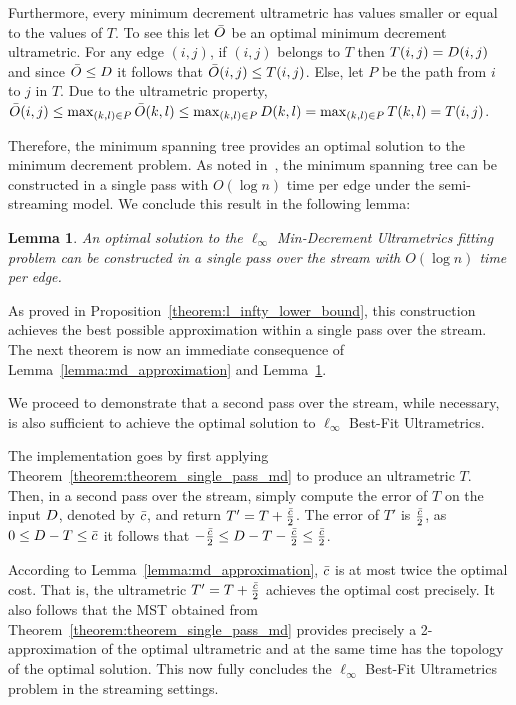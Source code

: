 \documentclass{article}
\newtheorem{lemma}[theorem]{Lemma}
\begin{document}
Furthermore, every minimum decrement ultrametric has values smaller or equal to the values of $T$. 
To see this let $\bar{O}$ be an optimal minimum decrement ultrametric. For any edge $(i,j)$, if $(i,j)$ belongs to $T$ then $T ({i,j})=D (i,j)$ and since $\bar{O} \leq D$ it follows that $\bar{O} ({i,j}) \leq T ({i,j})$. Else, let $P$ be the path from $i$ to $j$ in $T$. Due to the ultrametric property, $\bar{O} ({i,j}) \leq \max_{(k,l)\in P} \bar{O} ({k,l}) \leq 
\max_{(k,l)\in P} D ({k,l}) = \max_{(k,l)\in P} T ({k,l}) = T ({i,j})$.

Therefore, the minimum spanning tree provides an optimal solution to the minimum decrement problem. 
As noted in~\cite{feigenbaum2005graph}, the minimum spanning tree can be constructed in a single pass with $O(\log n)$ time per edge under the semi-streaming model. We conclude this result in the following lemma:

\begin{lemma}\label{lemma:optimal_md}
An optimal solution to the $\ell_\infty$ Min-Decrement Ultrametrics fitting problem can be constructed in a single pass over the stream with $O(\log n)$ time per edge.
\end{lemma}

As proved in Proposition~\ref{theorem:l_infty_lower_bound},
this construction achieves the best possible approximation within a single pass over the stream.
The next theorem is now an immediate consequence of Lemma~\ref{lemma:md_approximation} and Lemma~\ref{lemma:optimal_md}.

\inftysinglepass*

We proceed to demonstrate that a second pass over the stream, while necessary, is also sufficient to achieve the optimal solution to $\ell_\infty$ Best-Fit Ultrametrics.

The implementation goes by first applying Theorem~\ref{theorem:theorem_single_pass_md} to produce an ultrametric $T$. Then, in a second pass over the stream, simply compute the error of $T$ on the input $D$, denoted by $\bar{c}$, and return $T'=T+\frac{\bar{c}}{2}$.
The error of $T'$ is $\frac{\bar{c}}{2}$, as $0 \leq D-T \leq \bar{c}$ it follows that $-\frac{\bar{c}}{2} \leq D -T -\frac{\bar{c}}{2} \leq \frac{\bar{c}}{2}$.

According to Lemma~\ref{lemma:md_approximation}, $\bar{c}$ is at most twice the optimal cost. That is, the ultrametric $T'=T+\frac{\bar{c}}{2}$ achieves the optimal cost precisely.
It also follows that the MST obtained from Theorem~\ref{theorem:theorem_single_pass_md} provides precisely a 2-approximation of the optimal ultrametric and at the same time has the topology of the optimal solution.
This now fully concludes the $\ell_\infty$ Best-Fit Ultrametrics problem in the streaming settings.
\end{document}
